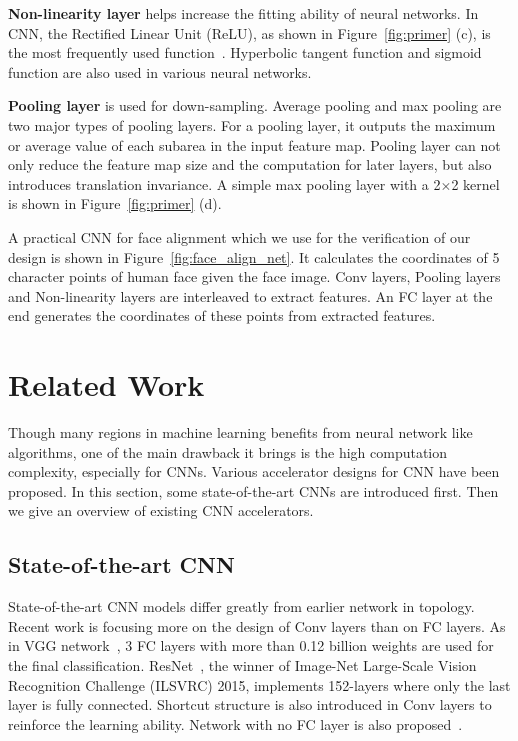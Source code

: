 \documentclass[10pt, conference, compsocconf]{IEEEtran}
\begin{document}
\textbf{Non-linearity layer} helps increase the fitting ability of neural networks. In CNN, the Rectified Linear Unit (ReLU), as shown in Figure~\ref{fig:primer} (c), is the most frequently used function~\cite{krizhevsky2012imagenet}. Hyperbolic tangent function and sigmoid function are also used in various neural networks.

\textbf{Pooling layer} is used for down-sampling. Average pooling and max pooling are two major types of pooling layers. For a pooling layer, it outputs the maximum or average value of each subarea in the input feature map. Pooling layer can not only reduce the feature map size and the computation for later layers, but also introduces translation invariance. A simple max pooling layer with a 2$\times$2 kernel is shown in Figure~\ref{fig:primer} (d).

A practical CNN for face alignment which we use for the verification of our design is shown in Figure~\ref{fig:face_align_net}. It calculates the coordinates of 5 character points of human face given the face image. Conv layers, Pooling layers and Non-linearity layers are interleaved to extract features. An FC layer at the end generates the coordinates of these points from extracted features.

\section{Related Work} \label{sec:related_work}
Though many regions in machine learning benefits from neural network like algorithms, one of the main drawback it brings is the high computation complexity, especially for CNNs. Various accelerator designs for CNN have been proposed. In this section, some state-of-the-art CNNs are introduced first. Then we give an overview of existing CNN accelerators.

\subsection{State-of-the-art CNN}
State-of-the-art CNN models differ greatly from earlier network in topology. Recent work is focusing more on the design of Conv layers than on FC layers. As in VGG network~\cite{simonyan2014very}, 3 FC layers with more than 0.12 billion weights are used for the final classification. ResNet~\cite{he2015deep}, the winner of Image-Net Large-Scale Vision Recognition Challenge (ILSVRC) 2015, implements 152-layers where only the last layer is fully connected. Shortcut structure is also introduced in Conv layers to reinforce the learning ability. Network with no FC layer is also proposed~\cite{long2015fully}.
\end{document}
